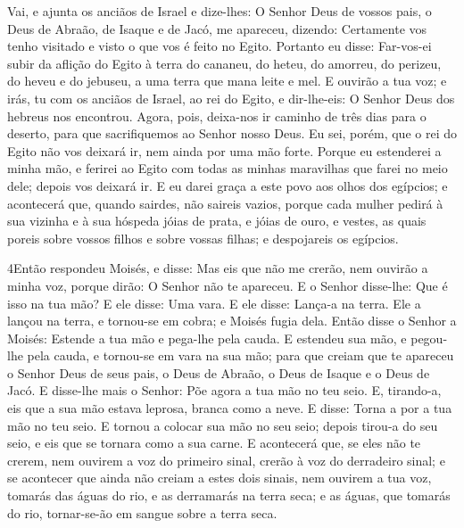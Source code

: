 Vai, e ajunta os anciãos de Israel e dize-lhes: O Senhor Deus de
vossos pais, o Deus de Abraão, de Isaque e de Jacó, me apareceu,
dizendo: Certamente vos tenho visitado e visto o que vos é feito no
Egito. Portanto eu disse: Far-vos-ei subir da aflição do
Egito à terra do cananeu, do heteu, do amorreu, do perizeu, do heveu
e do jebuseu, a uma terra que mana leite e mel. E ouvirão a
tua voz; e irás, tu com os anciãos de Israel, ao rei do Egito, e
dir-lhe-eis: O Senhor Deus dos hebreus nos encontrou. Agora, pois,
deixa-nos ir caminho de três dias para o deserto, para que
sacrifiquemos ao Senhor nosso Deus. Eu sei, porém, que o rei
do Egito não vos deixará ir, nem ainda por uma mão forte.
Porque eu estenderei a minha mão, e ferirei ao Egito com
todas as minhas maravilhas que farei no meio dele; depois vos
deixará ir. E eu darei graça a este povo aos olhos dos
egípcios; e acontecerá que, quando sairdes, não saireis vazios,
porque cada mulher pedirá à sua vizinha e à sua hóspeda jóias
de prata, e jóias de ouro, e vestes, as quais poreis sobre vossos
filhos e sobre vossas filhas; e despojareis os egípcios.

\medskip

\lettrine{4} Então respondeu Moisés, e disse: Mas eis que não
me crerão, nem ouvirão a minha voz, porque dirão: O Senhor não te
apareceu. E o Senhor disse-lhe: Que é isso na tua mão? E ele
disse: Uma vara. E ele disse: Lança-a na terra. Ele a lançou na
terra, e tornou-se em cobra; e Moisés fugia dela. Então disse o
Senhor a Moisés: Estende a tua mão e pega-lhe pela cauda. E estendeu
sua mão, e pegou-lhe pela cauda, e tornou-se em vara na sua mão;
para que creiam que te apareceu o Senhor Deus de seus pais, o
Deus de Abraão, o Deus de Isaque e o Deus de Jacó. E disse-lhe
mais o Senhor: Põe agora a tua mão no teu seio. E, tirando-a, eis
que a sua mão estava leprosa, branca como a neve. E disse: Torna
a por a tua mão no teu seio. E tornou a colocar sua mão no seu seio;
depois tirou-a do seu seio, e eis que se tornara como a sua carne.
E acontecerá que, se eles não te crerem, nem ouvirem a voz do
primeiro sinal, crerão à voz do derradeiro sinal; e se acontecer
que ainda não creiam a estes dois sinais, nem ouvirem a tua voz,
tomarás das águas do rio, e as derramarás na terra seca; e as águas,
que tomarás do rio, tornar-se-ão em sangue sobre a terra seca.

